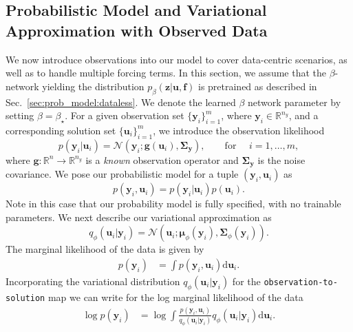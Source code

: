 \documentclass[11pt, fleqn]{article}
\def\bfSigma{{\mathbf \Sigma}}
\def\y{{\mathbf y}}
\def\z{{\mathbf z}}
\def\fbf{{\mathbf f}}
\def\ubf{{\mathbf u}}
\def\bR{{\mathbb R}}
\def\NPDF{{\mathcal N}}
\def\md{{\mathrm d}}
\def \bmu {{\boldsymbol \mu}}
\def \bSigma {{\mathbf \Sigma}}
\def \g {\mathbf{g}}
\begin{document}
\subsection{Probabilistic Model and Variational Approximation with Observed Data}\label{sec:prob_model:observed_data}
%
We now introduce observations into our model to cover data-centric scenarios, as well as to handle multiple forcing terms. In this section, we assume that the $\beta$-network yielding the distribution $p_\beta (\z| \ubf, \fbf) $ is pretrained as described in Sec.~\ref{sec:prob_model:dataless}. We denote the learned $\beta$ network parameter by setting $\beta = \beta_\star$. For a given observation set $\{\y_i \}_{i=1}^{m}$, where $\y_i\in \bR^{n_y}$, and a corresponding solution set $\{ \ubf_i \}_{i=1}^{m}$, we introduce the observation likelihood
\begin{equation}
    p(\y_i | \ubf_i) = \NPDF(\y_i; \g(\ubf_i), \bfSigma_\y), \quad\quad \text{for } \quad i = 1,\ldots,m,
\end{equation}
where $\g: \bR^n \to \bR^{n_y}$ is a \textit{known} observation operator and $\bSigma_\y$ is the noise covariance.
We pose our probabilistic model for a tuple $(\y_i, \ubf_i)$ as
\begin{equation}
    p(\y_{i}, \ubf_i) = p(\y_i|\ubf_i)p(\ubf_i).
\end{equation}
Note in this case that our probability model is fully specified, with no trainable parameters.  We next describe our variational approximation as
\begin{equation}
    q_\phi(\ubf_i | \y_i) = \NPDF(\ubf_i; \bmu_\phi(\y_i), \bSigma_\phi(\y_i)).
\end{equation}
The marginal likelihood of the data is given by
\begin{align}\label{eq:evidence_data}
    p(\y_i) &= \int p(\y_i, \ubf_i) \md \ubf_i.
\end{align}
Incorporating the variational distribution $q_\phi(\ubf_i|\y_i)$ for the \texttt{observation-to-solution} map we can write for the log marginal likelihood of the data
\begin{align}
    \log p(\y_i) &= \log \int \frac{p(\y_i, \ubf_i)}{q_\phi(\ubf_i|\y_i)} q_\phi(\ubf_i|\y_i) \md \ubf_i.
\end{align}
\end{document}
